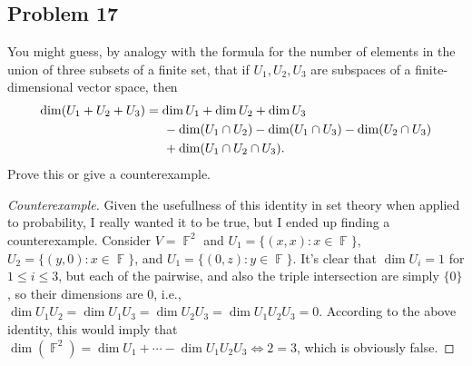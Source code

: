 \documentclass[letterpaper, 12pt]{amsart}
\DeclareMathOperator{\F}{\mathbb{F}}
\theoremstyle{definition}  %
\begin{document}
		\subsection*{Problem 17}
		You might guess, by analogy with the formula for the number of elements in the union of three subsets of a finite set, that if $U_{1}, U_{2}, U_{3}$ are subspaces of a finite-dimensional vector space, then 
		\begin{align*}
			\dim(U_{1} + U_{2} + U_{3}) &= \dim U_{1} + \dim U_{2} + \dim U_{3} \\
			&\hspace{5mm} - \dim(U_{1} \cap U_{2}) - \dim(U_{1} \cap U_{3}) - \dim(U_{2} \cap U_{3}) \\
			&\hspace{5mm} + \dim(U_{1} \cap U_{2} \cap U_{3}).
		\end{align*}
		Prove this or give a counterexample.

		\begin{proof}[Counterexample]
		Given the usefullness of this identity in set theory when applied to probability, I really wanted it to be true, but I ended up finding a counterexample.
		Consider $V = \F^{2}$ and $U_{1} = \{ (x,x) : x \in \F \}$, $U_{2} = \{ (y,0) : x \in \F \}$, and $U_{1} = \{ (0,z) : y \in \F \}$.
		It's clear that $\dim U_{i} = 1$ for $1 \leq i \leq 3$, but each of the pairwise, and also the triple intersection are simply $\{ 0 \}$, so their dimensions are $0$, i.e., $\dim U_{1}U_{2} = \dim U_{1}U_{3} = \dim U_{2}U_{3} = \dim U_{1}U_{2}U_{3} = 0$.
		According to the above identity, this would imply that $\dim(\F^{2}) = \dim U_{1} + \cdots - \dim U_{1}U_{2}U_{3} \iff  2 = 3$, which is obviously false.
		\end{proof}
\end{document}
